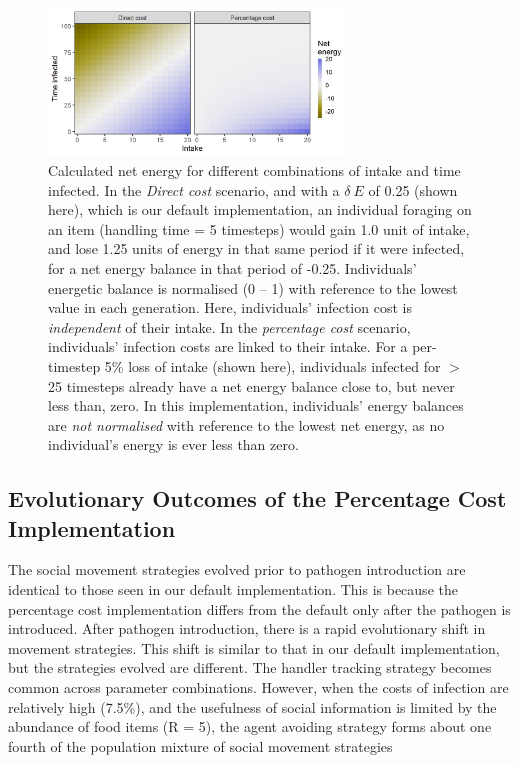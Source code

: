 \begin{figure}
    \centering
    \includegraphics[width=0.7\textwidth]{figures/pathomove/fig_cost_structure.png}
    \caption{
        Calculated net energy for different combinations of intake and time infected. 
        In the \emph{Direct cost} scenario, and with a $\delta~E$ of 0.25 (shown here), which is our default implementation, an individual foraging on an item (handling time = 5 timesteps) would gain 1.0 unit of intake, and lose 1.25 units of energy in that same period if it were infected, for a net energy balance in that period of -0.25. 
        Individuals' energetic balance is normalised (0 -- 1) with reference to the lowest value in each generation. 
        Here, individuals' infection cost is \emph{independent} of their intake. 
        In the \emph{percentage cost} scenario, individuals' infection costs are linked to their intake. 
        For a per-timestep 5\% loss of intake (shown here), individuals infected for $>$25 timesteps already have a net energy balance close to, but never less than, zero. 
        In this implementation, individuals' energy balances are \emph{not normalised} with reference to the lowest net energy, as no individual's energy is ever less than zero.
    }\label{fig:compare_cost_structure}
\end{figure}

\subsection*{Evolutionary Outcomes of the Percentage Cost Implementation}

The social movement strategies evolved prior to pathogen introduction are identical to those seen in our default implementation.
This is because the percentage cost implementation differs from the default only after the pathogen is introduced.
After pathogen introduction, there is a rapid evolutionary shift in movement strategies.
This shift is similar to that in our default implementation, but the strategies evolved are different.
The handler tracking strategy becomes common across parameter combinations.
However, when the costs of infection are relatively high (7.5\%), and the usefulness of social information is limited by the abundance of food items (R = 5), the agent avoiding strategy forms about one fourth of the population mixture of social movement strategies

